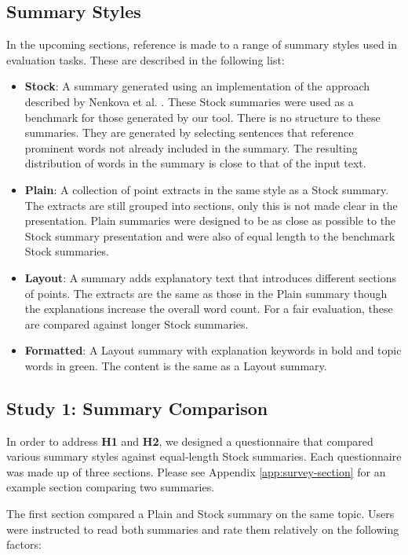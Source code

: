     \tocless\subsection{Summary Styles}
      In the upcoming sections, reference is made to a range of summary styles used in evaluation tasks. These are described in the following list:
      \begin{itemize}
        \item{\textbf{Stock}: A summary generated using an implementation of the approach described by Nenkova et al. \cite{nenkova2006compositional}. These Stock summaries were used as a benchmark for those generated by our tool. There is no structure to these summaries. They are generated by selecting sentences that reference prominent words not already included in the summary. The resulting distribution of words in the summary is close to that of the input text.}
        \item{\textbf{Plain}: A collection of point extracts in the same style as a Stock summary. The extracts are still grouped into sections, only this is not made clear in the presentation. Plain summaries were designed to be as close as possible to the Stock summary presentation and were also of equal length to the benchmark Stock summaries.}
        \item{\textbf{Layout}: A summary adds explanatory text that introduces different sections of points. The extracts are the same as those in the Plain summary though the explanations increase the overall word count. For a fair evaluation, these are compared against longer Stock summaries.}
        \item{\textbf{Formatted}: A Layout summary with explanation keywords in bold and topic words in green. The content is the same as a Layout summary.}
      \end{itemize}

    \tocless\subsection{Study 1: Summary Comparison\label{sec:stud1}}
      In order to address \textbf{H1} and \textbf{H2}, we designed a questionnaire that compared various summary styles against equal-length Stock summaries. Each questionnaire was made up of three sections. Please see Appendix \ref{app:survey-section} for an example section comparing two summaries.

      The first section compared a Plain and Stock summary on the same topic. Users were instructed to read both summaries and rate them relatively on the following factors:


